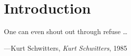 \chapter{Introduction}






\epigraph{One can even shout out through refuse \ldots}{\hfill---Kurt Schwitters, \textit{Kurt Schwitters}, 1985}









